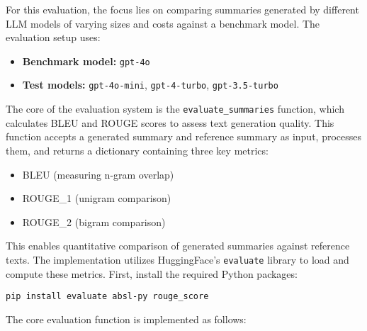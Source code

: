 For this evaluation, the focus lies on comparing summaries generated by different LLM models of varying sizes and costs against a benchmark model. The evaluation setup uses:

\begin{itemize}
    \item \textbf{Benchmark model:} \texttt{gpt-4o}
    \item \textbf{Test models:} \texttt{gpt-4o-mini}, \texttt{gpt-4-turbo}, \texttt{gpt-3.5-turbo}
\end{itemize}

The core of the evaluation system is the \texttt{evaluate\_summaries} function, which calculates BLEU and ROUGE scores to assess text generation quality. This function accepts a generated summary and reference summary as input, processes them, and returns a dictionary containing three key metrics:
\begin{itemize}
    \item BLEU (measuring n-gram overlap)
    \item ROUGE\_1 (unigram comparison)
    \item ROUGE\_2 (bigram comparison)
\end{itemize}

This enables quantitative comparison of generated summaries against reference texts. The implementation utilizes HuggingFace's \texttt{evaluate} library to load and compute these metrics.
First, install the required Python packages:

\begin{verbatim}
pip install evaluate absl-py rouge_score
\end{verbatim}

The core evaluation function is implemented as follows:

